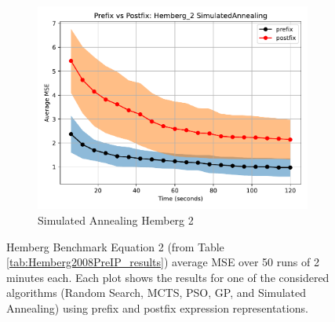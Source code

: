 \documentclass[12pt]{iopart}
\begin{document}
\begin{figure}
    \vspace{0.5cm}
    
    \begin{subfigure}[b]{0.4\textwidth}
        \includegraphics[width=\linewidth, keepaspectratio]{Hemberg_Benchmarks/PrePostHemberg_2SimulatedAnnealing.pdf}
        \caption{Simulated Annealing Hemberg 2}
        \label{subfig:hemberg_2_SA}
    \end{subfigure}
    
    \caption{Hemberg Benchmark Equation 2 (from Table \ref{tab:Hemberg2008PreIP_results}) average MSE over 50 runs of 2 minutes each. Each plot shows the results for one of the considered algorithms (Random Search, MCTS, PSO, GP, and Simulated Annealing) using prefix and postfix expression representations.}
    \label{fig:Hemberg_2_Benchmarks}
\end{figure}
\end{document}
